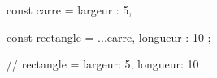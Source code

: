 const carre = {
    largeur : 5,
}

const rectangle = {
    ...carre,
    longueur : 10
};

// rectangle = { largeur: 5, longueur: 10 }